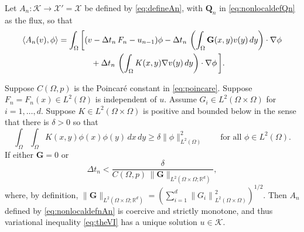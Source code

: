 \documentclass[final,onefignum]{siamart190516}
\newcommand\bG{\mathbf{G}}
\newcommand\bQ{\mathbf{Q}}
\newcommand{\grad}{\nabla}
\newcommand{\ip}[2]{\ensuremath{\left<#1,#2\right>}}
\newcommand\RR{\mathbb{R}}
\begin{document}
Let $A_n:\mathcal{K} \to \mathcal{X}'=\mathcal{X}$ be defined by \eqref{eq:defineAn}, with $\bQ_n$ in \eqref{eq:nonlocaldefQn} as the flux, so that
\begin{align}
    \ip{A_n(v)}{\phi} &= \int_\Omega \bigg[(v - \Delta t_n\,F_n - u_{n-1})\phi - \Delta t_n\,\left(\int_\Omega \bG(x,y) v(y)\,dy\right)\cdot \grad \phi \label{eq:nonlocaldefnAn} \\
                      &\qquad\qquad + \Delta t_n\,\left(\int_\Omega K(x,y) \grad v(y)\,dy\right)\cdot \grad \phi\,\bigg]. \notag
\end{align}

\begin{theorem}  \label{thm:nonlocalwellposed}  Suppose $C(\Omega,p)$ is the Poincar\'e constant in \eqref{eq:poincare}.  Suppose $F_n=F_n(x) \in L^2(\Omega)$ is independent of $u$.  Assume $G_i \in L^2(\Omega\times\Omega)$ for $i=1,\dots,d$.  Suppose $K \in L^2(\Omega\times\Omega)$ is positive and bounded below \cite{PorterStirling1990} in the sense that there is $\delta>0$ so that
\begin{equation}
   \int_\Omega \int_\Omega K(x,y) \phi(x) \phi(y)\,dx\,dy \ge \delta \|\phi\|_{L^2(\Omega)}^2 \qquad \text{for all } \phi \in L^2(\Omega).  \label{eq:nonlocalKpos}
\end{equation}
If either $\bG=0$ or
\begin{equation}
  \Delta t_n < \frac{\delta}{C(\Omega,p)\, \|\bG\|_{L^2(\Omega\times\Omega;\RR^d)}},  \label{eq:nonlocaldtcond}
\end{equation}
where, by definition, $\|\bG\|_{L^2(\Omega\times\Omega;\RR^d)} = \left(\sum_{i=1}^d \left\|G_i\right\|_{L^2(\Omega \times \Omega)}^2\right)^{1/2}$.  Then $A_n$ defined by \eqref{eq:nonlocaldefnAn} is coercive and strictly monotone, and thus variational inequality \eqref{eq:theVI} has a unique solution $u\in\mathcal{K}$.
\end{theorem}
\end{document}
